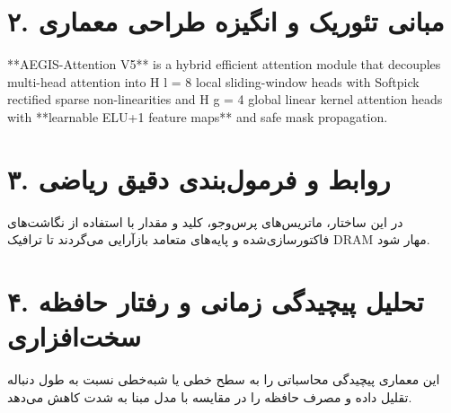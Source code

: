 \documentclass[12pt,a4paper]{article}
\begin{document}
\section*{۲. مبانی تئوریک و انگیزه طراحی معماری}
**AEGIS-Attention V5** is a hybrid efficient attention module that decouples multi-head attention into H l = 8 local sliding-window heads with Softpick rectified sparse non-linearities and H g = 4 global linear kernel attention heads with **learnable ELU+1 feature maps** and safe mask propagation.

\section*{۳. روابط و فرمول‌بندی دقیق ریاضی}
در این ساختار، ماتریس‌های پرس‌وجو، کلید و مقدار با استفاده از نگاشت‌های فاکتورسازی‌شده و پایه‌های متعامد بازآرایی می‌گردند تا ترافیک DRAM مهار شود.

\section*{۴. تحلیل پیچیدگی زمانی و رفتار حافظه سخت‌افزاری}
این معماری پیچیدگی محاسباتی را به سطح خطی یا شبه‌خطی نسبت به طول دنباله تقلیل داده و مصرف حافظه را در مقایسه با مدل مبنا به شدت کاهش می‌دهد.
\end{document}
